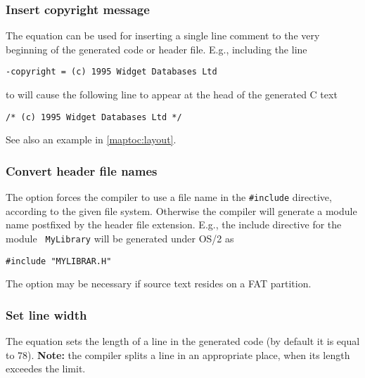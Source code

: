 
\subsubsection{Insert copyright message}

The  equation can be
used  for inserting a single line comment to the very beginning of
the generated code or header file. E.g., including the line
\begin{verbatim}
-copyright = (c) 1995 Widget Databases Ltd
\end{verbatim}
to {\bf \cfg} will cause the following line to appear
at the head of the generated C text
\begin{verbatim}
/* (c) 1995 Widget Databases Ltd */
\end{verbatim}

See also an example in \ref{maptoc:layout}.

\subsubsection{Convert header file names}

The  option
forces the compiler   to  use a file  name  in  the  \verb|#include|
directive,  according  to  the  given  file system. Otherwise the
compiler  will  generate a module name postfixed by the header file
extension.   E.g.,  the  include  directive  for  the  module  {\tt
MyLibrary} will be generated under OS/2 as
\begin{verbatim}
#include "MYLIBRAR.H"
\end{verbatim}
The  option may be necessary if source text resides on a FAT partition.

\subsubsection{Set line width}

The  equation
sets  the  length  of a line in the generated code
(by default it is equal to 78).
{\bf  Note:} the compiler splits a line in an appropriate place,
when its length exceedes the limit.

